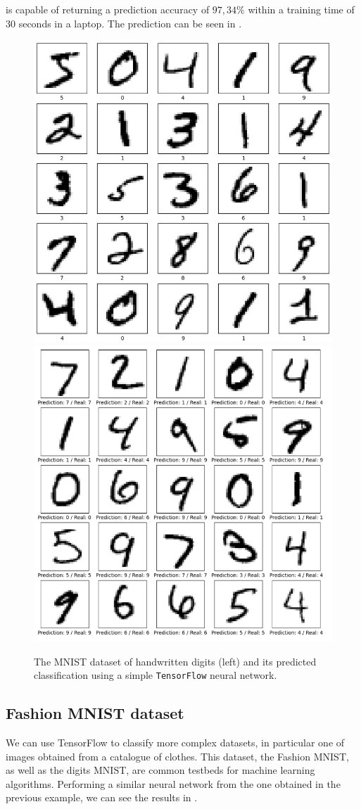 \documentclass[]{report}
\begin{document}
is capable of returning a prediction accuracy of $97,34\%$ within a training time of 30 seconds in a laptop. The prediction can be seen in . 

\begin{figure}\centering
\includegraphics[width = .475\linewidth]{images/mnist}
\includegraphics[width = .485\linewidth]{images/prediction-mnist}
\caption{The MNIST dataset of handwritten digits (left) and its predicted classification using a simple \texttt{TensorFlow} neural network.}
\label{fig.mnist}
\end{figure}

\subsection{Fashion MNIST dataset}

We can use TensorFlow to classify more complex datasets, in particular one of images obtained from a catalogue of clothes. This dataset, the Fashion MNIST, as well as the digits MNIST, are common testbeds for machine learning algorithms. Performing a similar neural network from the one obtained in the previous example, we can see the results in . 
\end{document}
